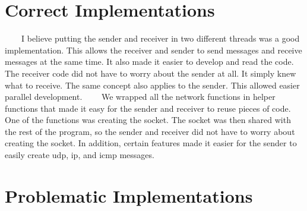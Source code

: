 \documentclass[11pt]{article}
\begin{document}
\section{Correct Implementations}
\ \ \ \ I believe putting the sender and receiver in two different threads was a good implementation. This allows the receiver and sender to send messages and receive messages at the same time. It also made it easier to develop and read the code. The receiver code did not have to worry about the sender at all. It simply knew what to receive. The same concept also applies to the sender. This allowed easier parallel development.\newline
\ \ \ \ We wrapped all the network functions in helper functions that made it easy for the sender and receiver to reuse pieces of code. One of the functions was creating the socket. The socket was then shared with the rest of the program, so the sender and receiver did not have to worry about creating the socket. In addition, certain features made it easier for the sender to easily create udp, ip, and icmp messages.

\section{Problematic Implementations}
\ \ \ \ 
\end{document}
